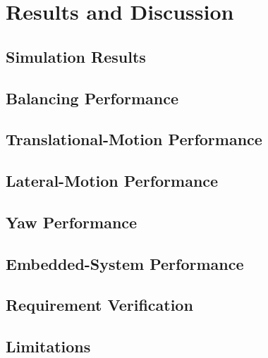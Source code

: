 \chapter{Results and Discussion}

\section{Simulation Results}

\section{Balancing Performance}

\section{Translational-Motion Performance}

\section{Lateral-Motion Performance}

\section{Yaw Performance}

\section{Embedded-System Performance}

\section{Requirement Verification}

\section{Limitations}
